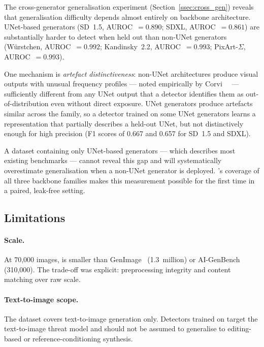 The cross-generator generalisation experiment
(Section~\ref{ssec:cross_gen}) reveals that generalisation difficulty
depends almost entirely on backbone architecture.
UNet-based generators (SD~1.5, AUROC~$= 0.890$; SDXL,
AUROC~$= 0.861$) are substantially harder to detect when held out
than non-UNet generators (W\"{u}rstchen, AUROC~$= 0.992$;
Kandinsky~2.2, AUROC~$= 0.993$; PixArt-$\Sigma$, AUROC~$= 0.993$).

One mechanism is \emph{artefact distinctiveness}: non-UNet
architectures produce visual outputs with unusual frequency profiles
--- noted empirically by Corvi~\etal~\cite{corvi2023detection} ---
sufficiently different from any UNet output that a detector identifies
them as out-of-distribution even without direct exposure.
UNet generators produce artefacts similar across the family, so a
detector trained on some UNet generators learns a representation that
partially describes a held-out UNet, but not distinctively enough for
high precision (F1 scores of 0.667 and 0.657 for SD~1.5 and SDXL).

A dataset containing only UNet-based generators --- which describes
most existing benchmarks --- cannot reveal this gap and will
systematically overestimate generalisation when a non-UNet generator
is deployed.
\textbf{\datasetname}'s coverage of all three backbone families makes
this measurement possible for the first time in a paired, leak-free
setting.

\subsection{Limitations}
\label{ssec:disc_limits}

\paragraph{Scale.}
At 70,000 images, \textbf{\datasetname} is smaller than
GenImage~\cite{zhu2023genimage} (1.3~million) or
AI-GenBench~\cite{pellegrini2025aigenbench} (310,000).
The trade-off was explicit: preprocessing integrity and content
matching over raw scale.

\paragraph{Text-to-image scope.}
The dataset covers text-to-image generation only.
Detectors trained on \textbf{\datasetname} target the text-to-image
threat model and should not be assumed to generalise to editing-based
or reference-conditioning synthesis.

